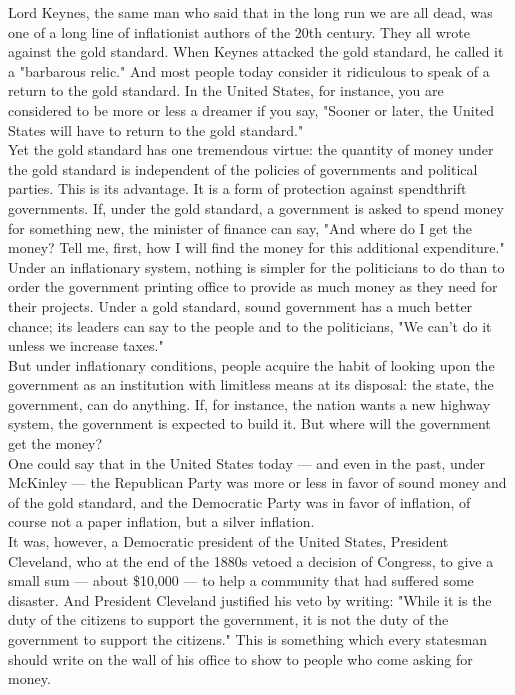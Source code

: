 \documentclass[a4paper]{article}
\begin{document}
Lord Keynes, the same man who said that in the long run we are all dead, was 
one of a long line of inflationist authors of the 20th century. They all wrote 
against the gold standard. When Keynes attacked the gold standard, he called it
a "barbarous relic." And most people today consider it ridiculous to speak of a
return to the gold standard. In the United States, for instance, you are 
considered to be more or less a dreamer if you say, "Sooner or later, the 
United States will have to return to the gold standard."\\

Yet the gold standard has one tremendous virtue: the quantity of money under 
the gold standard is independent of the policies of governments and political 
parties. This is its advantage. It is a form of protection against spendthrift 
governments. If, under the gold standard, a government is asked to spend money 
for something new, the minister of finance can say, "And where do I get the 
money? Tell me, first, how I will find the money for this additional 
expenditure."\\

Under an inflationary system, nothing is simpler for the politicians to do than
to order the government printing office to provide as much money as they need 
for their projects. Under a gold standard, sound government has a much better 
chance; its leaders can say to the people and to the politicians, "We can't do 
it unless we increase taxes."\\

But under inflationary conditions, people acquire the habit of looking upon the
government as an institution with limitless means at its disposal: the state, 
the government, can do anything. If, for instance, the nation wants a new 
highway system, the government is expected to build it. But where will the 
government get the money?\\

One could say that in the United States today — and even in the past, under 
McKinley — the Republican Party was more or less in favor of sound money and of
the gold standard, and the Democratic Party was in favor of inflation, of 
course not a paper inflation, but a silver inflation.\\

It was, however, a Democratic president of the United States, President 
Cleveland, who at the end of the 1880s vetoed a decision of Congress, to give a
small sum — about \$10,000 — to help a community that had suffered some 
disaster. And President Cleveland justified his veto by writing: "While it is 
the duty of the citizens to support the government, it is not the duty of the 
government to support the citizens." This is something which every statesman 
should write on the wall of his office to show to people who come asking for 
money.\\
\end{document}
